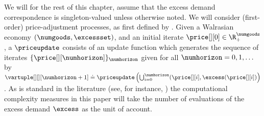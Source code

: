 

We will for the rest of this chapter, assume that the excess demand correspondence is singleton-valued unless otherwise noted. 
We will consider (first-order) price-adjustment processes, as first defined by \citet{papadimitriou2010impossibility}.
Given a Walrasian economy $(\numgoods, \excessset)$, and an initial iterate $\price[][0] \in \R^\numgoods_+$, a  $\priceupdate$ consists of an update function which generates the sequence of iterates $\{\price[][\numhorizon]\}_{\numhorizon}$ given for all $\numhorizon = 0, 1, \hdots$ by
$\vartuple[][][\numhorizon + 1] \doteq  \priceupdate \left(\bigcup_{i = 0}^{\numhorizon} (\price[][i],  \excess(\price[][i]) \right)$.
As is standard in the literature (see, for instance, \citet{papadimitriou2010impossibility}) the computational complexity measures in this paper will take the number of evaluations of the excess demand $\excess$ as the unit of account.

